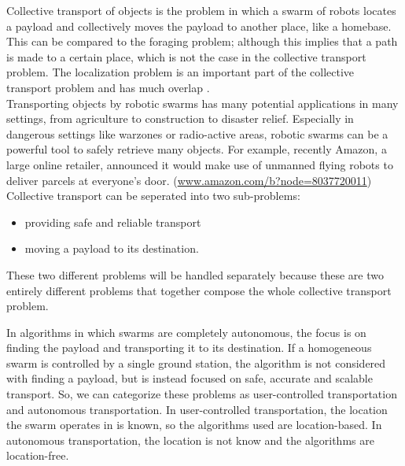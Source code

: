 
Collective transport of objects is the problem in which a swarm of robots locates a payload and collectively moves the payload to another place, like a homebase. 
This can be compared to the foraging problem; although this implies that a path is made to a certain place, which is not the case in the collective transport problem. \cite{hoff2010two}  
The localization problem is an important part of the collective transport problem and has much overlap .\\
Transporting objects by robotic swarms has many potential applications in many settings, from agriculture to construction to disaster relief. 
Especially in dangerous settings like warzones or radio-active areas, robotic swarms can be a powerful tool to safely retrieve many objects. 
For example, recently Amazon, a large online retailer, announced it would make use of unmanned flying robots to deliver parcels at everyone's door. (\url{www.amazon.com/b?node=8037720011}) \\

Collective transport can be seperated into two sub-problems:
\begin{itemize}
	\item  providing safe and reliable transport
	\item moving a payload to its destination.
\end{itemize}
These two different problems will be handled separately because these are two entirely different problems that together compose the whole collective transport problem. 

In algorithms in which swarms are completely autonomous, the focus is on finding the payload and transporting it to its destination.
If a homogeneous swarm is controlled by a single ground station, the algorithm is not considered with finding a payload, but is instead focused on safe, accurate and scalable transport. 
So, we can categorize these problems as user-controlled transportation and autonomous transportation.
In user-controlled transportation, the location the swarm operates in is known, so the algorithms used are location-based.
In autonomous transportation, the location is not know and the algorithms are location-free. \\

